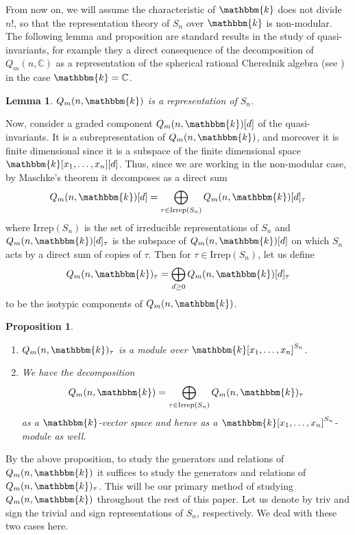 \documentclass[11pt]{article}
\newtheorem{lemma}[theorem]{Lemma}
\newtheorem{proposition}[theorem]{Proposition}
\theoremstyle{definition}
\renewcommand{\k}{\mathbbm{k}}
\newcommand{\Irrep}{\mathrm{Irrep}}
\newcommand{\C}{\mathbb{C}}
\begin{document}
From now on, we will assume the characteristic of $\k$ does not divide $n!$, so that the representation theory of $S_n$ over $\k$ is non-modular. The following lemma and proposition are standard results in the study of quasi-invariants, for example they a direct consequence of the decomposition of $Q_m(n,\C)$ as a representation of the spherical rational Cherednik algebra (see \cite{berest2003cherednik}) in the case $\k=\C$. 

\begin{lemma}\label{lem:2.4}
    $Q_m(n,\k)$ is a representation of $S_n$.
\end{lemma}

Now, consider a graded component $Q_m(n,\k)[d]$ of the quasi-invariants. It is a subrepresentation of $Q_m(n,\k)$, and moreover it is finite dimensional since it is a subspace of the finite dimensional space $\k[x_1,\dots,x_n][d]$. Thus, since we are working in the non-modular case, by Maschke's theorem it decomposes as a direct sum
$$Q_m(n,\k)[d]=\bigoplus_{\tau\in\Irrep(S_n)}Q_m(n,\k)[d]_\tau$$
where $\Irrep(S_n)$ is the set of irreducible representations of $S_n$ and $Q_m(n,\k)[d]_\tau$ is the subspace of $Q_m(n,\k)[d]$ on which $S_n$ acts by a direct sum of copies of $\tau$. Then for $\tau\in\Irrep(S_n)$, let us define
$$Q_m(n,\k)_\tau=\bigoplus_{d\geq 0}Q_m(n,\k)[d]_\tau$$
to be the isotypic components of $Q_m(n,\k)$.

\begin{proposition}\label{prop:2.5}
\begin{enumerate}
    \item $Q_m(n,\k)_\tau$ is a module over $\k[x_1,\dots,x_n]^{S_n}$.\label{prop:2.51}
    \item We have the decomposition
    $$Q_m(n,\k)=\bigoplus_{\tau\in\Irrep(S_n)}Q_m(n,\k)_\tau$$
    as a $\k$-vector space and hence as a $\k[x_1,\dots,x_n]^{S_n}$-module as well.\label{prop:2.52}
\end{enumerate}
\end{proposition}

By the above proposition, to study the generators and relations of $Q_m(n,\k)$ it suffices to study the generators and relations of $Q_m(n,\k)_\tau$. This will be our primary method of studying $Q_m(n,\k)$ throughout the rest of this paper. Let us denote by triv and sign the trivial and sign representations of $S_n$, respectively. We deal with these two cases here.
\end{document}
